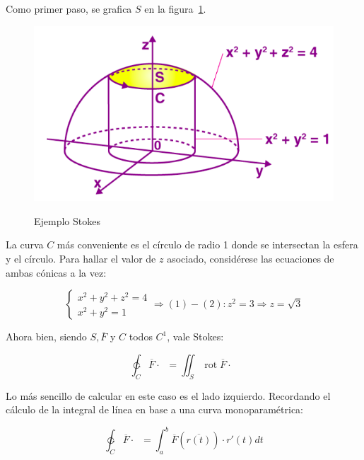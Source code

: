 \documentclass{article}
\begin{document}
\begin{enumerate}
Como primer paso, se grafica $S$ en la figura~\ref{fig:stokesex}.

\begin{figure}[ht]
\centering
\caption{Ejemplo Stokes}
\includegraphics[scale=0.7]{img/teo_fig035_stokesex.png}
\label{fig:stokesex}
\end{figure}

La curva $C$ más conveniente es el círculo de radio 1 donde se intersectan la esfera y el círculo. Para hallar el valor de $z$ asociado, considérese las ecuaciones de ambas cónicas a la vez:

\begin{equation}
\left\{
\begin{array}{ll}
x^2 + y^2 + z^2 = 4 \\
x^2 + y^2 = 1
\end{array}
\right. \Rightarrow (1) - (2): z^2 = 3 \Rightarrow z = \sqrt{3}
\end{equation}

Ahora bien, siendo $S, \overline{F}$ y $C$ todos $C^1$, vale Stokes:

\begin{equation}
\ointctrclockwise_C \overline{F} \cdot \mathop{\overline{dC}} = \iint_S \mathop{rot}\overline{F} \cdot \mathop{\overline{dS}}
\end{equation} 

Lo más sencillo de calcular en este caso es el lado izquierdo. Recordando el cálculo de la integral de línea en base a una curva monoparamétrica:

\begin{equation}
\ointctrclockwise_C \overline{F} \cdot \mathop{\overline{dC}} = \int_a^b \overline{F}(\overline{r(t)}) \cdot r'(t) dt
\end{equation}


\end{enumerate}
\end{document}
